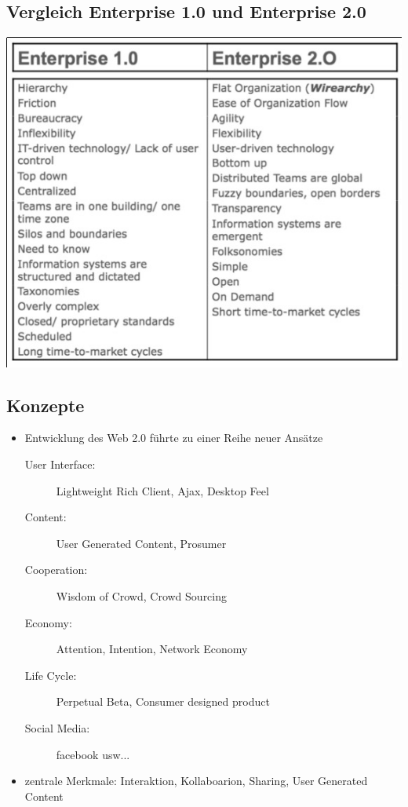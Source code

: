 \documentclass{article} %
\begin{document}
	\subsection{Vergleich Enterprise 1.0 und Enterprise 2.0}
	\begin{center}
		\includegraphics[scale=0.8]{img/CompareW1W2.jpg}
	\end{center}
	\subsection{Konzepte}
	\begin{itemize}
		\item Entwicklung des Web 2.0 führte zu einer Reihe neuer Ansätze
		\begin{description}
			\item[User Interface:] Lightweight Rich Client, Ajax, Desktop Feel
			\item[Content:] User Generated Content, Prosumer
			\item[Cooperation:] Wisdom of Crowd, Crowd Sourcing
			\item[Economy:] Attention, Intention, Network Economy
			\item[Life Cycle:] Perpetual Beta, Consumer designed product
			\item[Social Media:] facebook usw...
		\end{description}
		\item zentrale Merkmale: Interaktion, Kollaboarion, Sharing, User Generated Content
	\end{itemize}
\end{document}
